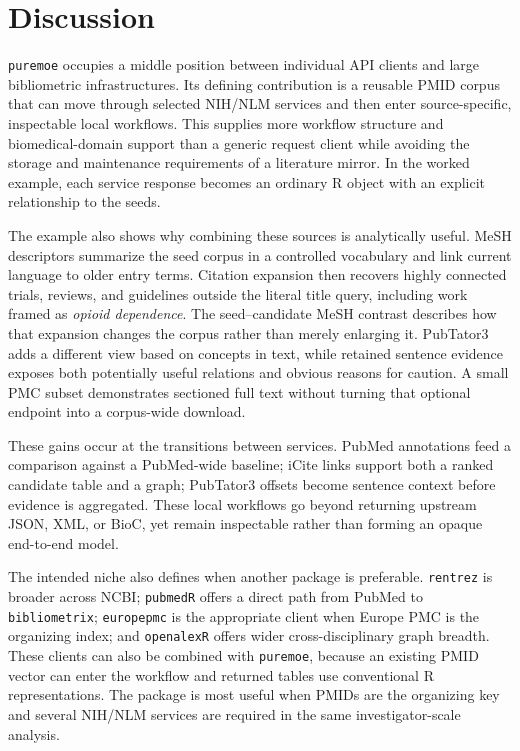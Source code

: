 \section{Discussion}\label{discussion}

\texttt{puremoe} occupies a middle position between individual API clients and large
bibliometric infrastructures. Its defining contribution is a reusable PMID
corpus that can move through selected NIH/NLM services and then enter
source-specific, inspectable local workflows. This supplies more workflow
structure and biomedical-domain support than a generic request client while
avoiding the storage and maintenance requirements of a literature mirror. In
the worked example, each service response becomes an ordinary R object with an
explicit relationship to the seeds.

The example also shows why combining these sources is analytically useful.
MeSH descriptors summarize the seed corpus in a controlled vocabulary and link
current language to older entry terms. Citation expansion then recovers highly
connected trials, reviews, and guidelines outside the literal title query,
including work framed as \emph{opioid dependence}. The seed--candidate MeSH contrast
describes how that expansion changes the corpus rather than merely enlarging
it. PubTator3 adds a different view based on concepts in text, while retained
sentence evidence exposes both potentially useful relations and obvious reasons
for caution. A small PMC subset demonstrates sectioned full text without
turning that optional endpoint into a corpus-wide download.

These gains occur at the transitions between services. PubMed annotations feed
a comparison against a PubMed-wide baseline; iCite links support both a ranked
candidate table and a graph; PubTator3 offsets become sentence context before
evidence is aggregated. These local workflows go beyond returning upstream
JSON, XML, or BioC, yet remain inspectable rather than forming an opaque
end-to-end model.

The intended niche also defines when another package is preferable. \texttt{rentrez}
is broader across NCBI; \texttt{pubmedR} offers a direct path from PubMed to
\texttt{bibliometrix}; \texttt{europepmc} is the appropriate client when Europe PMC is the
organizing index; and \texttt{openalexR} offers wider cross-disciplinary graph
breadth. These clients can also be combined with \texttt{puremoe}, because an existing
PMID vector can enter the workflow and returned tables use conventional R
representations. The package is most useful when PMIDs are the organizing key
and several NIH/NLM services are required in the same investigator-scale
analysis.

